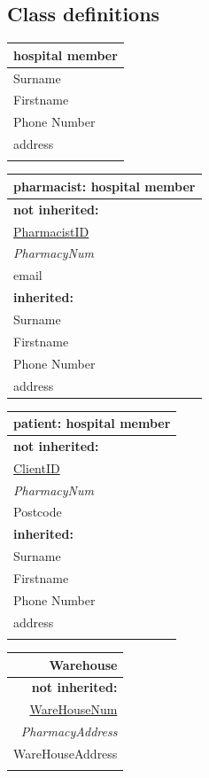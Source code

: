 \subsection{Class definitions}
\begin{table}[h]
\begin{tabular}{|l|}
\hline
hospital member\\
\hline
Surname\\
Firstname\\
Phone Number\\
address\\
\hline
\\
\hline
\end{tabular}
\begin{tabular}{|l|}
\hline
pharmacist: hospital member\\
\hline
\textbf{not inherited:}\\
\underline{PharmacistID}\\
\emph{PharmacyNum}\\
email\\
\textbf{inherited:}\\
Surname\\
Firstname\\
Phone Number\\
address\\
\hline
\end{tabular}
\begin{tabular}{|l|}
\hline
patient: hospital member\\
\hline
\textbf{not inherited:}\\
\underline{ClientID}\\
\emph{PharmacyNum}\\
Postcode\\
\textbf{inherited:}\\
Surname\\
Firstname\\
Phone Number\\
address\\
\hline
\\
\hline
\end{tabular}
\begin{tabular}{|r|}
\hline
Warehouse\\
\hline
\textbf{not inherited:}\\
\underline{WareHouseNum}\\
\emph{PharmacyAddress}\\
WareHouseAddress\\
\hline
\\

\end{tabular}
\end{table}

